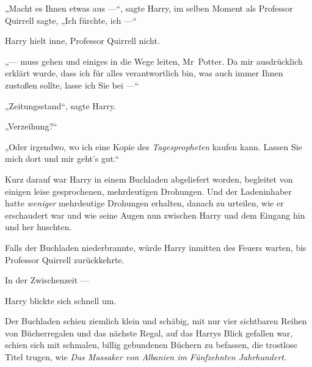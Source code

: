 „Macht es Ihnen etwas aus —“, sagte Harry, im selben Moment als Professor Quirrell sagte,
„Ich fürchte, ich —“

Harry hielt inne, Professor Quirrell nicht.

„— muss gehen und einiges in die Wege leiten, Mr~Potter. Da mir ausdrücklich erklärt wurde, dass ich für alles verantwortlich bin, was auch immer Ihnen zustoßen sollte, lasse ich Sie bei —“

„Zeitungsstand“, sagte Harry.

„Verzeihung?“

„Oder irgendwo, wo ich eine Kopie des \emph{Tagespropheten} kaufen kann. Lassen Sie mich dort und mir geht’s gut.“

Kurz darauf war Harry in einem Buchladen abgeliefert worden, begleitet von einigen leise gesprochenen, mehrdeutigen Drohungen. Und der Ladeninhaber hatte \emph{weniger} mehrdeutige Drohungen erhalten, danach zu urteilen, wie er erschaudert war und wie seine Augen nun zwischen Harry und dem Eingang hin und her huschten.

Falls der Buchladen niederbrannte, würde Harry inmitten des Feuers warten, bis Professor Quirrell zurückkehrte.

In der Zwischenzeit —

Harry blickte sich schnell um.

Der Buchladen schien ziemlich klein und schäbig, mit nur vier sichtbaren Reihen von Bücherregalen und das nächste Regal, auf das Harrys Blick gefallen war, schien sich mit schmalen, billig gebundenen Büchern zu befassen, die trostlose Titel trugen, wie \emph{Das Massaker von Albanien im Fünfzehnten Jahrhundert}.%

